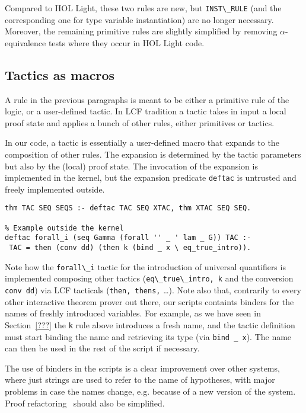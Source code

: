 \documentclass[preprint]{sigplanconf}
\begin{document}
Compared to HOL Light, these two rules are new, but \verb+INST\_RULE+ (and the corresponding one for type variable instantiation) are no longer necessary. Moreover, the remaining primitive rules are slightly simplified by removing $\alpha$-equivalence tests where they occur in HOL Light code.

\subsection{Tactics as macros}
A rule in the previous paragraphs is meant to be either a primitive rule of the logic, or a user-defined tactic. In LCF tradition a tactic takes in input a local proof state and applies a bunch of other rules, either primitives or tactics.

In our code, a tactic is essentially a user-defined macro that expands to the composition of other rules. The expansion is determined by the tactic parameters but also by the (local) proof state. The invocation of the expansion is implemented in the kernel, but the expansion predicate \verb+deftac+ is untrusted and freely implemented outside.

\begin{small}
\begin{verbatim}
thm TAC SEQ SEQS :- deftac TAC SEQ XTAC, thm XTAC SEQ SEQ.

% Example outside the kernel
deftac forall_i (seq Gamma (forall '' _ ' lam _ G)) TAC :-
 TAC = then (conv dd) (then k (bind _ x \ eq_true_intro)).
\end{verbatim}
\end{small}

Note how the \verb+forall\_i+ tactic for the introduction of universal quantifiers is implemented composing other tactics (\verb+eq\_true\_intro, k+ and the conversion \verb+conv dd+) via LCF tacticals (\verb+then, thens,+ \ldots). Note also that, contrarily to every other interactive theorem prover out there, our scripts containts binders for the names of freshly introduced variables. For example, as we have seen in Section~\ref{???} the \verb+k+ rule above introduces a fresh name, and the tactic definition must start binding the name and retrieving its type (via \verb+bind _ x+). The name can then be used in the rest of the script if necessary.

The use of binders in the scripts is a clear improvement over other systems, where just strings are used to refer to the name of hypotheses, with major problems in case the names change, e.g. because of a new version of the system. Proof refactoring~\cite{iain1} should also be simplified.
\end{document}
